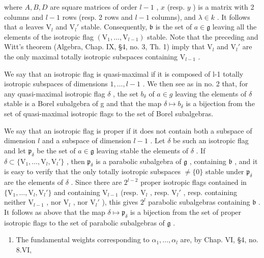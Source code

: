 where \(A, B, D\) are square matrices of order \(l - 1\) , \(x\) (resp. \(y\) ) is a matrix with 2 columns and \(l - 1\) rows (resp. 2 rows and \(l - 1\) columns), and \(\lambda \in k\) . It follows that \(a\) leaves \(\mathrm{V}_l\) and \(\mathrm{V}_l'\) stable. Consequently, \(\mathfrak{b}\) is the set of \(a \in \mathfrak{g}\) leaving all the elements of the isotropic flag \((\mathrm{V}_1, \ldots, \mathrm{V}_{l-1})\) stable. Note that the preceding and Witt's theorem (Algebra, Chap. IX, §4, no. 3, Th. 1) imply that \(\mathrm{V}_l\) and \(\mathrm{V}_l'\) are the only maximal totally isotropic subspaces containing \(\mathrm{V}_{l-1}\) .

We say that an isotropic flag is quasi-maximal if it is composed of l-1 totally isotropic subspaces of dimensions \(1,\ldots,l-1\) . We then see as in no. 2 that, for any quasi-maximal isotropic flag \(\delta\) , the set \(b_{\delta}\) of \(a\in g\) leaving the elements of \(\delta\) stable is a Borel subalgebra of g and that the map \(\delta\mapsto b_{\delta}\) is a bijection from the set of quasi-maximal isotropic flags to the set of Borel subalgebras.

We say that an isotropic flag is proper if it does not contain both a subspace of dimension \(l\) and a subspace of dimension \(l-1\) . Let \(\delta\) be such an isotropic flag and let \(\mathfrak{p}_{\delta}\) be the set of \(a \in \mathfrak{g}\) leaving stable the elements of \(\delta\) . If \(\delta \subset \{\mathrm{V}_1, \ldots, \mathrm{V}_l, \mathrm{V}_l'\}\) , then \(\mathfrak{p}_{\delta}\) is a parabolic subalgebra of \(\mathfrak{g}\) , containing \(\mathfrak{b}\) , and it is easy to verify that the only totally isotropic subspaces \(\neq \{0\}\) stable under \(\mathfrak{p}_{\delta}\) are the elements of \(\delta\) . Since there are \(2^{l-2}\) proper isotropic flags contained in \(\{\mathrm{V}_1, \ldots, \mathrm{V}_l, \mathrm{V}_l'\}\) and containing \(\mathrm{V}_{l-1}\) (resp. \(\mathrm{V}_l\) , resp. \(\mathrm{V}_l'\) , resp. containing neither \(\mathrm{V}_{l-1}\) , nor \(\mathrm{V}_l\) , nor \(\mathrm{V}_l'\) ), this gives \(2^l\) parabolic subalgebras containing \(\mathfrak{b}\) . It follows as above that the map \(\delta \mapsto \mathfrak{p}_{\delta}\) is a bijection from the set of proper isotropic flags to the set of parabolic subalgebras of \(\mathfrak{g}\) .

\begin{enumerate}
\def\labelenumi{(\Roman{enumi})}
\setcounter{enumi}{3}
\tightlist
\item
  The fundamental weights corresponding to \(\alpha_{1},\ldots,\alpha_{l}\) are, by Chap. VI, §4, no. 8.VI,
\end{enumerate}

